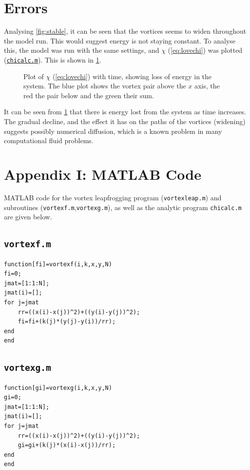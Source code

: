 \documentclass[10pt, a4paper]{article}
\numberwithin{equation}{section}
\begin{document}
\section{Errors}
Analysing \cref{fig:stable}, it can be seen that the vortices seems to widen throughout the model run.
This would suggest energy is not staying constant.
To analyse this, the model was run with the same settings, and $\chi$ (\cref{eq:lovechi}) was plotted (\hyperref[chicalc]{\texttt{chicalc.m}}).
This is shown in \cref{fig:chicalc}.
\begin{figure}[ht]
\centering
\setlength\figureheight{7.5cm} 
\setlength\figurewidth{\textwidth}

\caption{Plot of $\chi$ (\cref{eq:lovechi}) with time, showing loss of energy in the system. The blue plot shows the vortex pair above the $x$ axis, the red the pair below and the green their sum.}
\label{fig:chicalc}
\end{figure}

It can be seen from \cref{fig:chicalc} that there is energy lost from the system as time increases.
The gradual decline, and the effect it has on the paths of the vortices (widening) suggests possibly numerical diffusion, which is a known problem in many computational fluid problems.

\clearpage
\section*{Appendix I: MATLAB Code}\label{sec:ap1}
MATLAB code for the vortex leapfrogging program (\texttt{vortexleap.m}\normalfont) and subroutines (\texttt{vortexf.m}\normalfont,\texttt{vortexg.m}), as well as the analytic program \texttt{chicalc.m} are given below.
\subsection*{\texttt{vortexf.m}}
\label{vortexf}
\begin{verbatim}
function[fi]=vortexf(i,k,x,y,N)
fi=0;
jmat=[1:1:N];
jmat(i)=[];
for j=jmat
    rr=((x(i)-x(j))^2)+((y(i)-y(j))^2);
    fi=fi+(k(j)*(y(j)-y(i))/rr);
end
end
\end{verbatim}
\subsection*{\texttt{vortexg.m}}
\label{vortexg}
\begin{verbatim}
function[gi]=vortexg(i,k,x,y,N)
gi=0;
jmat=[1:1:N];
jmat(i)=[];
for j=jmat
    rr=((x(i)-x(j))^2)+((y(i)-y(j))^2);
    gi=gi+(k(j)*(x(i)-x(j))/rr);
end
end
\end{verbatim}
\end{document}
